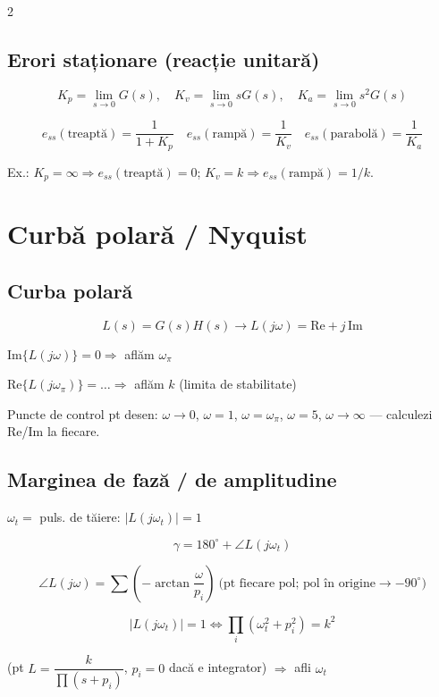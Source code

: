 \documentclass[8pt,a4paper]{extarticle}
\begin{document}
\begin{multicols}{2}
\subsection{Erori staționare (reacție unitară)}
$$K_p=\lim_{s\to0}G(s),\quad K_v=\lim_{s\to0}sG(s),\quad K_a=\lim_{s\to0}s^2G(s)$$
\begin{keyeq}
$$e_{ss}(\text{treaptă})=\frac1{1+K_p}\quad e_{ss}(\text{rampă})=\frac1{K_v}\quad e_{ss}(\text{parabolă})=\frac1{K_a}$$
\end{keyeq}
Ex.: $K_p=\infty \Rightarrow e_{ss}(\text{treaptă})=0$; $K_v=k \Rightarrow e_{ss}(\text{rampă})=1/k$.

\section{Curbă polară / Nyquist}

\subsection{Curba polară}
$$L(s)=G(s)H(s) \to L(j\omega)=\mathrm{Re}+j\,\mathrm{Im}$$
\begin{keyeq}
$\mathrm{Im}\{L(j\omega)\}=0 \Rightarrow$ aflăm $\omega_\pi$

$\mathrm{Re}\{L(j\omega_\pi)\}=\dots \Rightarrow$ aflăm $k$ (limita de stabilitate)
\end{keyeq}
Puncte de control pt desen: $\omega\to0$, $\omega=1$, $\omega=\omega_\pi$, $\omega=5$, $\omega\to\infty$ --- calculezi Re/Im la fiecare.

\begin{center}
\end{center}

\subsection{Marginea de fază / de amplitudine}
$\omega_t=$ puls. de tăiere: $|L(j\omega_t)|=1$
\begin{keyeq}
$$\gamma=180^\circ+\angle L(j\omega_t)$$
\end{keyeq}
$$\angle L(j\omega)=\sum\left(-\arctan\frac{\omega}{p_i}\right)\ \text{(pt fiecare pol; pol în origine} \to -90^\circ\text{)}$$
\begin{keyeq}
$$|L(j\omega_t)|=1 \iff \prod_i(\omega_t^2+p_i^2)=k^2$$
\end{keyeq}
(pt $L=\dfrac{k}{\prod(s+p_i)}$, $p_i=0$ dacă e integrator) $\Rightarrow$ afli $\omega_t$


\end{multicols}
\end{document}
